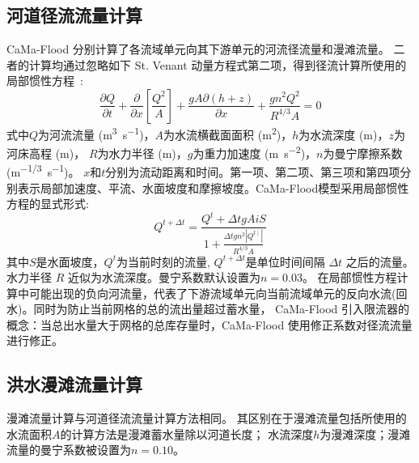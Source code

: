 \subsection{河道径流流量计算}
CaMa-Flood 分别计算了各流域单元向其下游单元的河流径流量和漫滩流量。
二者的计算均通过忽略如下 St. Venant 动量方程式第二项，得到径流计算所使用的局部惯性方程~\citep{bates2010}:
\begin{equation}
\frac{\partial Q}{\partial t}+\frac{\partial}{\partial x}\left[\frac{Q^{2}}{A}\right]+\frac{g A \partial(h+z)}{\partial x}+\frac{g n^{2} Q^{2}}{R^{4 / 3} A}=0
\end{equation}
式中$Q$为河流流量 (\unit{m^3.s^{-1}})，$A$为水流横截面面积 (\unit{m^2})，$h$为水流深度 (m)，$z$为河床高程 (m)，
$R$为水力半径 (m)，$g$为重力加速度 (\unit{m.s^{-2}})，$n$为曼宁摩擦系数(\unit{m^{-1/3}.s^{-1}})。
$x$和$t$分别为流动距离和时间。第一项、第二项、第三项和第四项分别表示局部加速度、平流、水面坡度和摩擦坡度。CaMa-Flood模型采用局部惯性方程的显式形式: 
%
\begin{equation}
Q^{t+\Delta t}=\frac{Q^{t}+\Delta t g A i S}{1+\frac{\Delta t g n^{2}\left|Q^{t \mid}\right|}{R^{4 / 3} A}}
\end{equation}
其中$S$是水面坡度，$Q^t$为当前时刻的流量, $Q^{t+\Delta t}$是单位时间间隔 $\Delta t$ 之后的流量。水力半径 $R$ 近似为水流深度。曼宁系数默认设置为$n=0.03$。
在局部惯性方程计算中可能出现的负向河流量，代表了下游流域单元向当前流域单元的反向水流(回水)。同时为防止当前网格的总的流出量超过蓄水量，
CaMa-Flood 引入限流器的概念：当总出水量大于网格的总库存量时，CaMa-Flood 使用修正系数对径流流量进行修正。


\subsection{洪水漫滩流量计算}
漫滩流量计算与河道径流流量计算方法相同。
其区别在于漫滩流量包括所使用的水流面积$A$的计算方法是漫滩蓄水量除以河道长度；
水流深度$h$为漫滩深度；漫滩流量的曼宁系数被设置为$n=0.10$。


